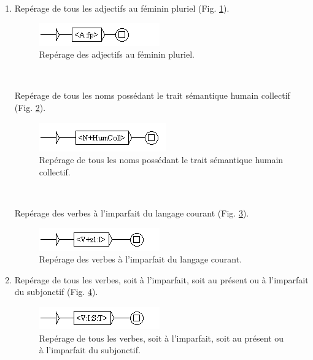 \documentclass[xcolor={table,usenames,dvipsnames}]{article}
\begin{document}
\begin{enumerate}
	\bigskip
	\item Repérage de tous les adjectifs au féminin pluriel (Fig. \ref{fig:adjectif_fp}).
		\begin{figure}[H] %
		\centering
		\includegraphics[width=.7\linewidth]{img/adjectif_fp.png}
		\caption{Repérage des adjectifs au féminin pluriel.}
		\label{fig:adjectif_fp}
	\end{figure}
	
	\\
	\bigskip
	
		 Repérage de tous les noms possédant le trait sémantique \og{}humain collectif\fg{} (Fig. \ref{fig:collectif}).
	\begin{figure}[H] %
		\centering
		\includegraphics[width=.7\linewidth]{img/collectif.png}
		\caption{Repérage de tous les noms possédant le trait sémantique \og{}humain collectif\fg{}.}
		\label{fig:collectif}
	\end{figure}
	
	\\
	\bigskip
	
	Repérage des verbes à l'imparfait du langage courant (Fig. \ref{fig:verbe_impf}).
			\begin{figure}[H] %
		\centering
		\includegraphics[width=.7\linewidth]{img/verbe_impf_courant.png}
		\caption{Repérage des verbes à l'imparfait du langage courant.}
		\label{fig:verbe_impf}
	\end{figure}
	
	\item Repérage de tous les verbes, soit à l'imparfait, soit au présent ou à l'imparfait du subjonctif (Fig. \ref{fig:verbe_impf_pres_impfsubj}).
				\begin{figure}[H] %
		\centering
		\includegraphics[width=.7\linewidth]{img/verbe_impf_pres_impfsubj.png}
		\caption{Repérage de tous les verbes, soit à l'imparfait, soit au présent ou à l'imparfait du subjonctif.}
		\label{fig:verbe_impf_pres_impfsubj}
	\end{figure}
	

\end{enumerate}
\end{document}
